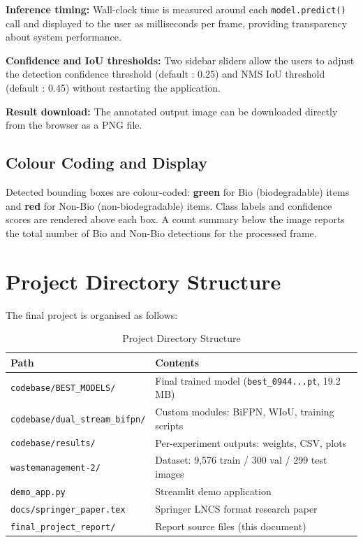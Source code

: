\textbf{Inference timing:} Wall-clock time is measured around each \texttt{model.predict()} call and displayed to the user as milliseconds per frame, providing transparency about system performance.

\textbf{Confidence and IoU thresholds:} Two sidebar sliders allow the users to adjust the detection confidence threshold (default : 0.25) and NMS IoU threshold (default : 0.45) without restarting the application.

\textbf{Result download:} The annotated output image can be downloaded directly from the browser as a PNG file.

\subsection{Colour Coding and Display}

Detected bounding boxes are colour-coded: \textbf{green} for Bio (biodegradable) items and \textbf{red} for Non-Bio (non-biodegradable) items. Class labels and confidence scores are rendered above each box. A count summary below the image reports the total number of Bio and Non-Bio detections for the processed frame.

\section{Project Directory Structure}

The final project is organised as follows:

\begin{table}[H]
\centering
\caption{Project Directory Structure}
\label{tab:dir}
\renewcommand{\arraystretch}{1.15}
\footnotesize
\begin{tabular}{ll}
\toprule
\textbf{Path} & \textbf{Contents} \\
\midrule
\texttt{codebase/BEST\_MODELS/}        & Final trained model (\texttt{best\_0944...pt}, 19.2 MB) \\
\texttt{codebase/dual\_stream\_bifpn/} & Custom modules: BiFPN, WIoU, training scripts \\
\texttt{codebase/results/}             & Per-experiment outputs: weights, CSV, plots \\
\texttt{wastemanagement-2/}            & Dataset: 9,576 train / 300 val / 299 test images \\
\texttt{demo\_app.py}                  & Streamlit demo application \\
\texttt{docs/springer\_paper.tex}      & Springer LNCS format research paper \\
\texttt{final\_project\_report/}       & Report source files (this document) \\
\bottomrule
\end{tabular}
\end{table}

